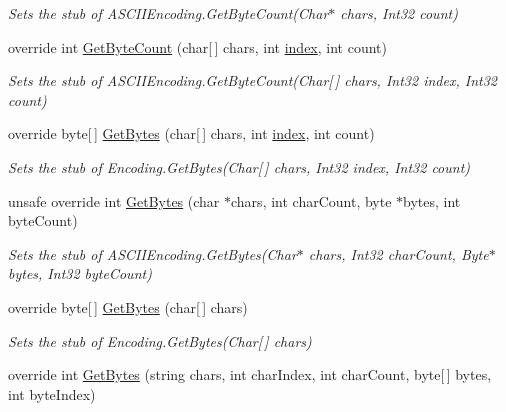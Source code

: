 \begin{DoxyCompactItemize}
\begin{DoxyCompactList}\small\item\em Sets the stub of A\-S\-C\-I\-I\-Encoding.\-Get\-Byte\-Count(\-Char$\ast$ chars, Int32 count)\end{DoxyCompactList}\item 
override int \hyperlink{class_system_1_1_text_1_1_fakes_1_1_stub_a_s_c_i_i_encoding_aee124fd62b6f9c5524f0afa3d1dbec7e}{Get\-Byte\-Count} (char\mbox{[}$\,$\mbox{]} chars, int \hyperlink{jquery-1_810_82-vsdoc_8js_a75bb12d1f23302a9eea93a6d89d0193e}{index}, int count)
\begin{DoxyCompactList}\small\item\em Sets the stub of A\-S\-C\-I\-I\-Encoding.\-Get\-Byte\-Count(\-Char\mbox{[}$\,$\mbox{]} chars, Int32 index, Int32 count)\end{DoxyCompactList}\item 
override byte\mbox{[}$\,$\mbox{]} \hyperlink{class_system_1_1_text_1_1_fakes_1_1_stub_a_s_c_i_i_encoding_a315d30d58100329122d767bdf1f8d1e6}{Get\-Bytes} (char\mbox{[}$\,$\mbox{]} chars, int \hyperlink{jquery-1_810_82-vsdoc_8js_a75bb12d1f23302a9eea93a6d89d0193e}{index}, int count)
\begin{DoxyCompactList}\small\item\em Sets the stub of Encoding.\-Get\-Bytes(\-Char\mbox{[}$\,$\mbox{]} chars, Int32 index, Int32 count)\end{DoxyCompactList}\item 
unsafe override int \hyperlink{class_system_1_1_text_1_1_fakes_1_1_stub_a_s_c_i_i_encoding_a4f51a5a838dda074ec3941104cafb51a}{Get\-Bytes} (char $\ast$chars, int char\-Count, byte $\ast$bytes, int byte\-Count)
\begin{DoxyCompactList}\small\item\em Sets the stub of A\-S\-C\-I\-I\-Encoding.\-Get\-Bytes(\-Char$\ast$ chars, Int32 char\-Count, Byte$\ast$ bytes, Int32 byte\-Count)\end{DoxyCompactList}\item 
override byte\mbox{[}$\,$\mbox{]} \hyperlink{class_system_1_1_text_1_1_fakes_1_1_stub_a_s_c_i_i_encoding_a4261190ba5b7d6da114079d36aae7420}{Get\-Bytes} (char\mbox{[}$\,$\mbox{]} chars)
\begin{DoxyCompactList}\small\item\em Sets the stub of Encoding.\-Get\-Bytes(\-Char\mbox{[}$\,$\mbox{]} chars)\end{DoxyCompactList}\item 
override int \hyperlink{class_system_1_1_text_1_1_fakes_1_1_stub_a_s_c_i_i_encoding_a8339f32b279d229649765c7a731e294e}{Get\-Bytes} (string chars, int char\-Index, int char\-Count, byte\mbox{[}$\,$\mbox{]} bytes, int byte\-Index)

\end{DoxyCompactItemize}
